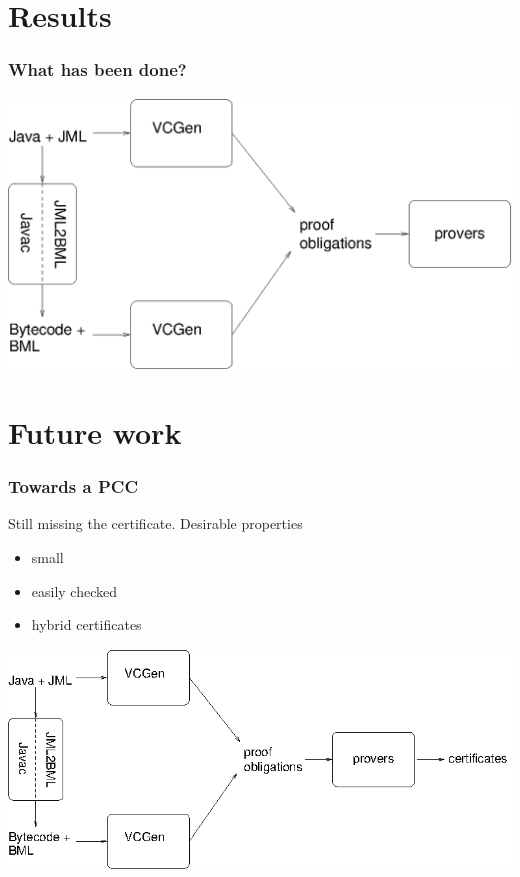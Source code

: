 \documentclass{beamer}
\begin{document}
 
\section{Results}

\begin{frame}\frametitle{What has been done?}
\begin{center}
\includegraphics[height=\textheight]{figs/toolset.eps}
\end{center}
\end{frame}


 \section{Future work}

\begin{frame}\frametitle{Towards  a PCC }
  Still missing the certificate. Desirable properties
                    \begin{itemize}
	                \item  small 
			  \item easily checked 
			  \item  hybrid certificates 
		     \end{itemize}

\begin{center}
\includegraphics{figs/toolSetPCC.eps}
\end{center}
\end{frame}
\end{document}
